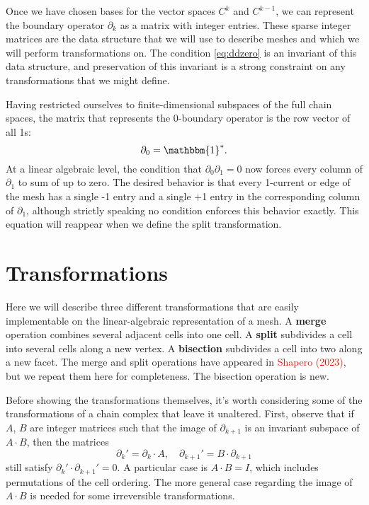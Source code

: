 \documentclass[twocolumn]{article}
\begin{document}
Once we have chosen bases for the vector spaces $C^k$ and $C^{k - 1}$, we can represent the boundary operator $\partial_k$ as a matrix with integer entries.
These sparse integer matrices are the data structure that we will use to describe meshes and which we will perform transformations on.
The condition \eqref{eq:ddzero} is an invariant of this data structure, and preservation of this invariant is a strong constraint on any transformations that we might define.

Having restricted ourselves to finite-dimensional subspaces of the full chain spaces, the matrix that represents the 0-boundary operator is the row vector of all 1s:
\begin{equation}
    \partial_0 = \mathbbm{1}^*.
    \label{eq:0-boundary-matrix}
\end{equation}
At a linear algebraic level, the condition that $\partial_0\partial_1 = 0$ now forces every column of $\partial_1$ to sum of up to zero.
The desired behavior is that every 1-current or edge of the mesh has a single -1 entry and a single +1 entry in the corresponding column of $\partial_1$, although strictly speaking no condition enforces this behavior exactly.
This equation will reappear when we define the split transformation.


\section{Transformations}

Here we will describe three different transformations that are easily implementable on the linear-algebraic representation of a mesh.
A \textbf{merge} operation combines several adjacent cells into one cell.
A \textbf{split} subdivides a cell into several cells along a new vertex.
A \textbf{bisection} subdivides a cell into two along a new facet.
The merge and split operations have appeared in \textcolor{red}{Shapero (2023)}, but we repeat them here for completeness.
The bisection operation is new.

Before showing the transformations themselves, it's worth considering some of the transformations of a chain complex that leave it unaltered.
First, observe that if $A$, $B$ are integer matrices such that the image of $\partial_{k + 1}$ is an invariant subspace of $A\cdot B$, then the matrices
\begin{equation}
    \partial_k' = \partial_k\cdot A, \quad \partial_{k + 1}' = B\cdot\partial_{k + 1}
\end{equation}
still satisfy $\partial_k'\cdot\partial_{k + 1}' = 0$.
A particular case is $A\cdot B = I$, which includes permutations of the cell ordering.
The more general case regarding the image of $A\cdot B$ is needed for some irreversible transformations.
\end{document}
